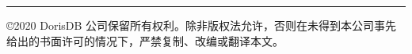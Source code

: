 
\noindent \rule{\textwidth}{1pt}

©2020 DorisDB 公司保留所有权利。除非版权法允许，否则在未得到本公司事先给出的书面许可的情况下，严禁复制、改编或翻译本文。